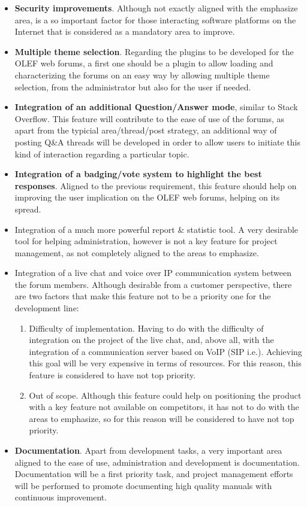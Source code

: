 \documentclass[11pt]{article}
\begin{document}
\begin{itemize}\itemsep0pt
\item{\textbf{Security improvements}}. Although not exactly aligned with the emphasize area, is a so important factor for those interacting software platforms on the Internet that is considered as a mandatory area to improve.
\item{\textbf{Multiple theme selection}}. Regarding the plugins to be developed for the OLEF web forums, a first one should be a plugin to allow loading and characterizing the forums on an easy way by allowing multiple theme selection, from the administrator but also for the user if needed.
\item{\textbf{Integration of an additional Question/Answer mode}},  similar to Stack Overflow. This feature will contribute to the ease of use of the forums, as apart from the typicial area/thread/post strategy, an additional way of posting Q\&A threads will be developed in order to allow users to initiate this kind of interaction regarding a particular topic.
\item{\textbf{Integration of a badging/vote system to highlight the best responses}}. Aligned to the previous requirement, this feature should help on improving the user implication on the OLEF web forums, helping on its spread.
\item{Integration of a much more powerful report \& statistic tool}. A very desirable tool for helping administration, however is not a key feature for project management, as not completely aligned to the areas to emphasize.
\item{Integration of a live chat and voice over IP communication system between the forum members}. Although desirable from a customer perspective, there are two factors that make this feature not to be a priority one for the development line:
\begin{enumerate}\itemsep0pt
\item{Difficulty of implementation}. Having to do with the difficulty of integration on the project of the live chat, and, above all, with the integration of a communication server based on VoIP (SIP i.e.). Achieving this goal will be very expensive in terms of resources. For this reason, this feature is considered to have not top priority.
\item{Out of scope}. Although this feature could help on positioning the product with a key feature not available on competitors, it has not to do with the areas to emphasize, so for this reason will be considered to have not top priority.
\end{enumerate}
\item{\textbf{Documentation}}. Apart from development tasks, a very important area aligned to the ease of use, administration and development is documentation. Documentation will be a first priority task, and project management efforts will be performed to promote documenting high quality manuals with continuous improvement.
\end{itemize}
\end{document}
